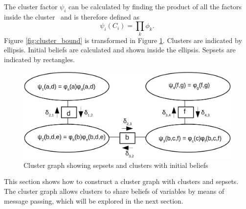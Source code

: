 \documentclass[12pt,oneside,openany,a4paper, %
afrikaans,english,
]{memoir}
\numberwithin{equation}{chapter}
\begin{document}
{The cluster factor $\psi_i$ can be calculated by finding the product of all the factors inside the cluster~\citep{koller} and is therefore defined as
\begin{equation}
\psi_i(C_i) = \prod_{k}\phi_k.
\end{equation}
Figure \ref{fig:cluster_bound} is transformed in Figure \ref{fig:clustergraph}. Clusters are indicated by ellipsis. Initial beliefs are calculated and shown inside the ellipsis. Sepsets are indicated by rectangles.
\begin{figure}[H]
  \includegraphics[width=0.7\linewidth]{Figures/clustergraph.png}
  \centering
  \caption{Cluster graph showing sepsets and clusters with initial beliefs}
  \label{fig:clustergraph}
\end{figure}
This section shows how to construct a cluster graph with clusters and sepsets. The cluster graph allows clusters to share beliefs of variables by means of message passing, which will be explored in the next section. 
}
\end{document}
